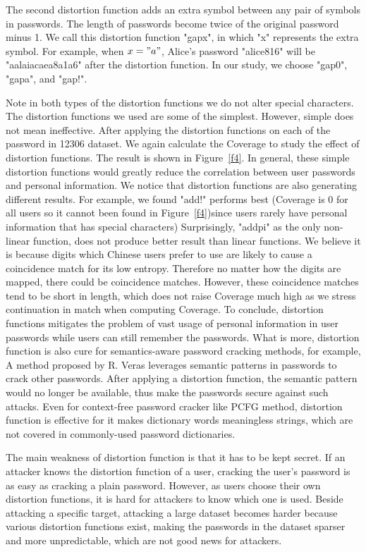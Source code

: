 The second distortion function adds an extra symbol between any pair of symbols in passwords. The length of passwords become twice of the original password minus 1. We call this distortion function "gapx", in which "x" represents the extra symbol. For example, when $x = "a"$, Alice's password "alice816" will be "aalaiacaea8a1a6" after the distortion function. In our study, we choose "gap0", "gapa", and "gap!".

Note in both types of the distortion functions we do not alter special characters. The distortion functions we used are some of the simplest. However, simple does not mean ineffective. After applying the distortion functions on each of the password in 12306 dataset. We again calculate the Coverage to study the effect of distortion functions. The result is shown in Figure~\ref{f4}. In general, these simple distortion functions would greatly reduce the correlation between user passwords and personal information. We notice that distortion functions are also generating different results. For example, we found "add!" performs best (Coverage is 0 for all users so it cannot been found in Figure~\ref{f4})since users rarely have personal information that has special characters) Surprisingly, "addpi" as the only non-linear function, does not produce better result than linear functions. We believe it is because digits which Chinese users prefer to use are likely to cause a coincidence match for its low entropy. Therefore no matter how the digits are mapped, there could be coincidence matches. However, these coincidence matches tend to be short in length, which does not raise Coverage much high as we stress continuation in match when computing Coverage. To conclude, distortion functions mitigates the problem of vast usage of personal information in user passwords while users can still remember the passwords. What is more, distortion function is also cure for semantics-aware password cracking methods, for example, A method \cite{veras2014semantic} proposed by R. Veras leverages semantic patterns in passwords to crack other passwords. After applying a distortion function, the semantic pattern would no longer be available, thus make the passwords secure against such attacks. Even for context-free password cracker like PCFG method, distortion function is effective for it makes dictionary words meaningless strings, which are not covered in commonly-used password dictionaries. 

The main weakness of distortion function is that it has to be kept secret. If an attacker knows the distortion function of a user, cracking the user's password is as easy as cracking a plain password. However, as users choose their own distortion functions, it is hard for attackers to know which one is used. Beside attacking a specific target, attacking a large dataset becomes harder because various distortion functions exist, making the passwords in the dataset sparser and more unpredictable, which are not good news for attackers.
 
